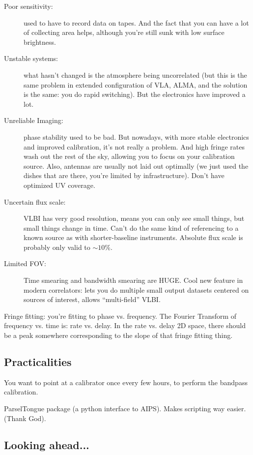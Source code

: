 \documentclass[a4paper]{article}
\begin{document}
\begin{description}

\item[Poor sensitivity:] used to have to record data on tapes. And the fact that you can have a lot of collecting area helps, although you're still sunk with low surface brightness. 
\item[Unstable systems:] what hasn't changed is the atmosphere being uncorrelated (but this is the same problem in extended configuration of VLA, ALMA, and the solution is the same: you do rapid switching). But the electronics have improved a lot.
\item[Unreliable Imaging:] phase stability used to be bad. But nowadays, with more stable electronics and improved calibration, it's not really a problem. And high fringe rates wash out the rest of the sky, allowing you to focus on your calibration source. Also, antennas are usually not laid out optimally (we just used the dishes that are there, you're limited by infrastructure). Don't have optimized UV coverage. 
\item[Uncertain flux scale:] VLBI has very good resolution, means you can only see small things, but small things change in time. Can't do the same kind of referencing to a known source as with shorter-baseline instruments. Absolute flux scale is probably only valid to $\sim 10$\%. 
\item[Limited FOV:] Time smearing and bandwidth smearing are HUGE. Cool new feature in modern correlators: lets you do multiple small output datasets centered on sources of interest, allows ``multi-field'' VLBI. 

\end{description}

Fringe fitting: you're fitting to phase vs. frequency.
The Fourier Transform of frequency vs. time is: rate vs. delay. In the rate vs. delay 2D space, there should be a peak somewhere corresponding to the slope of that fringe fitting thing.

\subsection{Practicalities}

You want to point at a calibrator once every few hours, to perform the bandpass calibration. 

ParselTongue package (a python interface to AIPS). Makes scripting way easier. (Thank God). 

\subsection{Looking ahead...}
\end{document}
